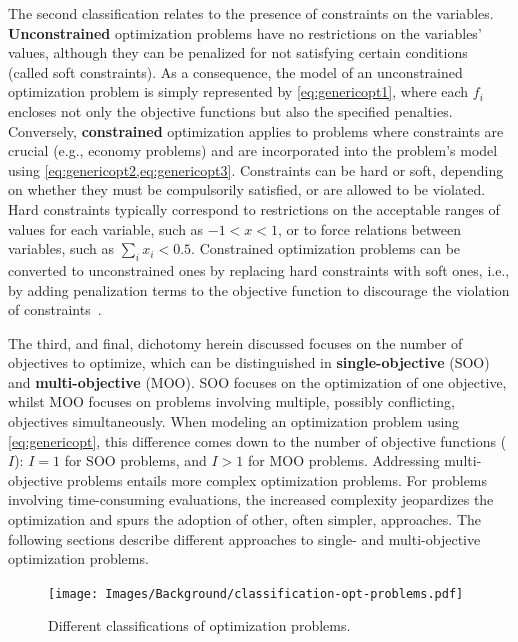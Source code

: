 	The second classification relates to the presence of constraints on the variables. \textbf{Unconstrained} optimization problems have no restrictions on the variables' values, although they can be penalized for not satisfying certain conditions (called soft constraints). As a consequence, the model of an unconstrained optimization problem is simply represented by \cref{eq:genericopt1}, where each $f_i$ encloses not only the objective functions but also the specified penalties. Conversely, \textbf{constrained} optimization applies to problems where constraints are crucial (e.g., economy problems) and are incorporated into the problem's model using \cref{eq:genericopt2,eq:genericopt3}. Constraints can be hard or soft, depending on whether they must be compulsorily satisfied, or are allowed to be violated. Hard constraints typically correspond to restrictions on the acceptable ranges of values for each variable, such as $-1<x<1$, or to force relations between variables, such as $\sum_{i} x_i<0.5$. Constrained optimization problems can be converted to unconstrained ones by replacing hard constraints with soft ones, i.e., by adding penalization terms to the objective function to discourage the violation of constraints~\cite{Nocedal2011NumericalOptimization}. 
	
	The third, and final, dichotomy herein discussed focuses on the number of objectives to optimize, which can be distinguished in \textbf{single-objective} (\ac{SOO}) and \textbf{multi-objective} (\ac{MOO}). \ac{SOO} focuses on the optimization of one objective, whilst \ac{MOO} focuses on problems involving multiple, possibly conflicting, objectives simultaneously. When modeling an optimization problem using \cref{eq:genericopt}, this difference comes down to the number of objective functions ($I$): $I=1$ for \ac{SOO} problems, and $I>1$ for \ac{MOO} problems. Addressing multi-objective problems entails more complex optimization problems. For problems involving time-consuming evaluations, the increased complexity jeopardizes the optimization and spurs the adoption of other, often simpler, approaches. The following sections describe different approaches to single- and multi-objective optimization problems. 
	
	\begin{figure}
		\centering
		\texttt{[image: Images/Background/classification-opt-problems.pdf]}
		\caption{Different classifications of optimization problems.}
		\label{fig:optclassification}
	\end{figure}
	
